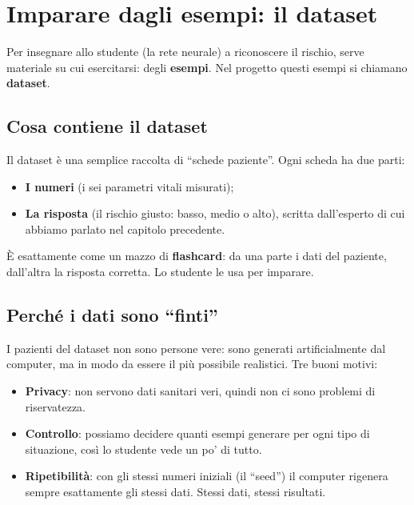 \chapter{Imparare dagli esempi: il dataset}\label{cap:p1-dati}


Per insegnare allo studente (la rete neurale) a riconoscere il rischio, serve
materiale su cui esercitarsi: degli \textbf{esempi}. Nel progetto questi
esempi si chiamano \textbf{dataset}.

\section{Cosa contiene il dataset}\label{sec:p1-dati-cosa}

Il dataset è una semplice raccolta di ``schede paziente''. Ogni scheda ha due
parti:

\begin{itemize}
  \item \textbf{I numeri} (i sei parametri vitali misurati);
  \item \textbf{La risposta} (il rischio giusto: basso, medio o alto), scritta
        dall'esperto di cui abbiamo parlato nel capitolo precedente.
\end{itemize}

È esattamente come un mazzo di \textbf{flashcard}: da una parte i dati del
paziente, dall'altra la risposta corretta. Lo studente le usa per imparare.

\section{Perché i dati sono ``finti''}\label{sec:p1-dati-sintetici}

I pazienti del dataset non sono persone vere: sono generati artificialmente
dal computer, ma in modo da essere il più possibile realistici. Tre buoni
motivi:

\begin{itemize}
  \item \textbf{Privacy}: non servono dati sanitari veri, quindi non ci sono
        problemi di riservatezza.
  \item \textbf{Controllo}: possiamo decidere quanti esempi generare per ogni
        tipo di situazione, così lo studente vede un po' di tutto.
  \item \textbf{Ripetibilità}: con gli stessi numeri iniziali (il ``seed'') il
        computer rigenera sempre esattamente gli stessi dati. Stessi dati,
        stessi risultati.
\end{itemize}

